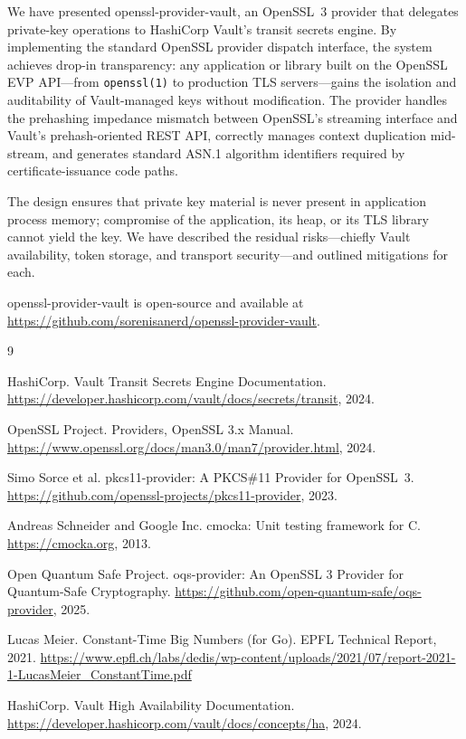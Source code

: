 \documentclass[sigconf,10pt]{acmart}
\begin{document}
We have presented openssl-provider-vault, an OpenSSL~3 provider that delegates
private-key operations to HashiCorp Vault's transit secrets engine.  By
implementing the standard OpenSSL provider dispatch interface, the system
achieves drop-in transparency: any application or library built on the
OpenSSL EVP API---from \texttt{openssl(1)} to production TLS servers---gains
the isolation and auditability of Vault-managed keys without modification.
The provider handles the prehashing impedance mismatch between OpenSSL's
streaming interface and Vault's prehash-oriented REST API, correctly manages
context duplication mid-stream, and generates standard ASN.1 algorithm
identifiers required by certificate-issuance code paths.

The design ensures that private key material is never present in application
process memory; compromise of the application, its heap, or its TLS library
cannot yield the key.  We have described the residual risks---chiefly Vault
availability, token storage, and transport security---and outlined mitigations
for each.

openssl-provider-vault is open-source and available at
\url{https://github.com/sorenisanerd/openssl-provider-vault}.


\begin{thebibliography}{9}

HashiCorp.
\newblock Vault Transit Secrets Engine Documentation.
\newblock \url{https://developer.hashicorp.com/vault/docs/secrets/transit},
  2024.

OpenSSL Project.
\newblock Providers, OpenSSL 3.x Manual.
\newblock \url{https://www.openssl.org/docs/man3.0/man7/provider.html}, 2024.

Simo Sorce et al.
\newblock pkcs11-provider: A PKCS\#11 Provider for OpenSSL~3.
\newblock \url{https://github.com/openssl-projects/pkcs11-provider}, 2023.

Andreas Schneider and Google Inc.
\newblock cmocka: Unit testing framework for C.
\newblock \url{https://cmocka.org}, 2013.

Open Quantum Safe Project.
\newblock oqs-provider: An OpenSSL 3 Provider for Quantum-Safe Cryptography.
\newblock \url{https://github.com/open-quantum-safe/oqs-provider}, 2025.

Lucas Meier.
\newblock Constant-Time Big Numbers (for Go).
\newblock EPFL Technical Report, 2021.
\newblock \url{https://www.epfl.ch/labs/dedis/wp-content/uploads/2021/07/report-2021-1-LucasMeier_ConstantTime.pdf}

HashiCorp.
\newblock Vault High Availability Documentation.
\newblock \url{https://developer.hashicorp.com/vault/docs/concepts/ha}, 2024.

\end{thebibliography}
\end{document}
